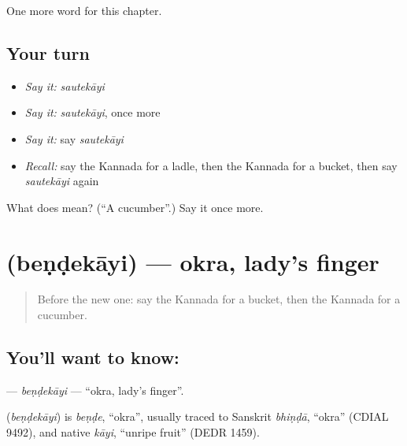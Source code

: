 \begin{grammarlens}[title={What you've built}]
One more word for this chapter.
\end{grammarlens}

\subsection*{Your turn}
\begin{itemize}
\raggedright
  \item \emph{Say it:} \emph{sautekāyi}
  \item \emph{Say it:} \emph{sautekāyi}, once more
  \item \emph{Say it:} say \emph{sautekāyi}
  \item \emph{Recall:} say the Kannada for a ladle, then the Kannada for a bucket, then say \emph{sautekāyi} again
\end{itemize}

\begin{tcolorbox}[breakable,colback=teal!4,colframe=teal!35!black,title={Before you move on}]
What does  mean? (\textquotedblleft{}A cucumber\textquotedblright{}.) Say it once more.
\end{tcolorbox}
\section[\texorpdfstring{\kn{ಬೆಂಡೆಕಾಯಿ} (beṇḍekāyi)}{ಬೆಂಡೆಕಾಯಿ (beṇḍekāyi)}]{ (beṇḍekāyi) — okra, lady's finger}

\label{lesson:KA-C184-bendekayi}



\begin{quote}
Before the new one: say the Kannada for a bucket, then the Kannada for a cucumber.
\end{quote}

\subsection*{You'll want to know: }
\textbf{} — \emph{beṇḍekāyi} — \textquotedblleft{}okra, lady's finger\textquotedblright{}.

\begin{cousinweb}
\textbf{} (\emph{beṇḍekāyi}) is \emph{beṇḍe}, \textquotedblleft{}okra\textquotedblright{}, usually traced to Sanskrit \emph{bhiṇḍā}, \textquotedblleft{}okra\textquotedblright{} (CDIAL 9492), and native \emph{kāyi}, \textquotedblleft{}unripe fruit\textquotedblright{} (DEDR 1459).
\end{cousinweb}


